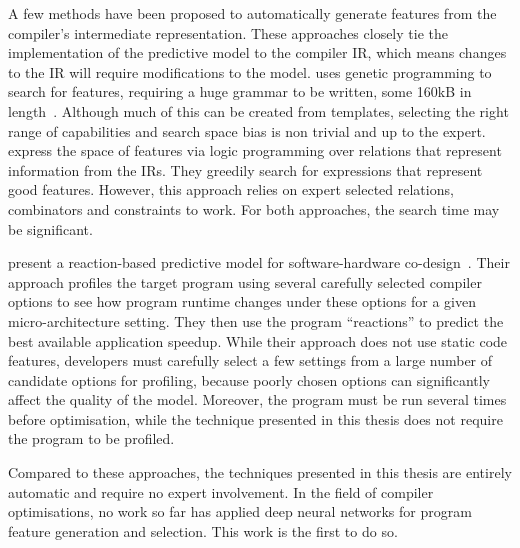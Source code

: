 A few methods have been proposed to automatically generate features from the compiler's intermediate representation. These approaches closely tie the implementation of the predictive model to the compiler IR, which means changes to the IR will require modifications to the model.
\citeauthor{Leather2014} uses genetic programming to search for features, requiring a huge grammar to be written, some 160kB in length~\cite{Leather2014}. Although much of this can be created from templates, selecting the right range of capabilities and search space bias is non trivial and up to the expert.
\citeauthor{Namolaru2010a} express the space of features via logic programming over relations that represent information from the IRs. They greedily search for expressions that represent good features. However, this approach relies on expert selected relations, combinators and constraints to work. For both approaches, the search time may be significant.

\citeauthor{Cavazos2006} present a reaction-based predictive model for software-hardware co-design~\cite{Cavazos2006}. Their approach profiles the target program using several carefully selected compiler options to see how program runtime changes under these options for a given micro-architecture setting. They then use the program ``reactions'' to predict the best available application speedup. While their approach does not use static code features, developers must carefully select a few settings from a large number of candidate options for profiling, because poorly chosen options can significantly affect the quality of the model. Moreover, the program must be run several times before optimisation, while the technique presented in this thesis does not require the program to be profiled.

Compared to these approaches, the techniques presented in this thesis are entirely automatic and require no expert involvement. In the field of compiler optimisations, no work so far has applied deep neural networks for program feature generation and selection. This work is the first to do so.


